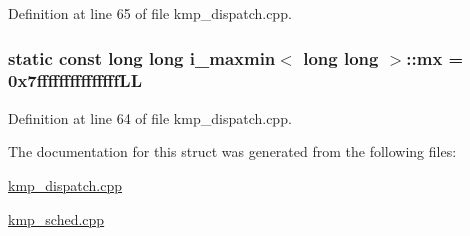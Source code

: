 Definition at line 65 of file kmp\-\_\-dispatch.\-cpp.

\hypertarget{structi__maxmin_3_01long_01long_01_4_ad4c05907e6730cde0dfa4c5fde1d8103}{
\subsubsection[{mx}]{\setlength{\rightskip}{0pt plus 5cm}static const long long {\bf i\-\_\-maxmin}$<$ long long $>$\-::mx = 0x7fffffffffffffff\-L\-L\hspace{0.3cm}{\ttfamily [static]}}}\label{structi__maxmin_3_01long_01long_01_4_ad4c05907e6730cde0dfa4c5fde1d8103}


Definition at line 64 of file kmp\-\_\-dispatch.\-cpp.



The documentation for this struct was generated from the following files\-:\begin{DoxyCompactItemize}
\item 
\hyperlink{kmp__dispatch_8cpp}{kmp\-\_\-dispatch.\-cpp}\item 
\hyperlink{kmp__sched_8cpp}{kmp\-\_\-sched.\-cpp}\end{DoxyCompactItemize}
